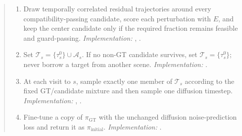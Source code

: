 \begin{quote}
\begin{enumerate}
  \item Draw temporally correlated residual trajectories around every
  compatibility-passing candidate, score each perturbation with $E$, and keep
  the center candidate only if the required fraction remains feasible and
  guard-passing.  \emph{Implementation:}
  ,
  .

  \item Set $\mathcal T_s=\{\tau_s^0\}\cup\mathcal A_s$.  If no non-GT
  candidate survives, set $\mathcal T_s=\{\tau_s^0\}$; never borrow a target
  from another scene.  \emph{Implementation:}
  .

  \item At each visit to $s$, sample exactly one member of $\mathcal T_s$
  according to the fixed GT/candidate mixture and then sample one diffusion
  timestep.  \emph{Implementation:}
  ,
  .

  \item Fine-tune a copy of $\pi_{\mathrm{GT}}$ with the unchanged diffusion
  noise-prediction loss and return it as $\pi_{\mathrm{initial}}$.
  \emph{Implementation:}
  .
\end{enumerate}
\end{quote}

